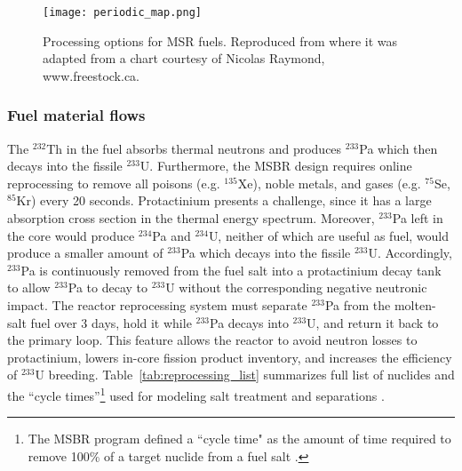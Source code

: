 \begin{figure}[htp!] %
  \texttt{[image: periodic\_map.png]}
  \caption{Processing options for \gls{MSR} fuels. 
          Reproduced from \cite{ahmad_neutronics_2015} where it was adapted 
          from a chart courtesy of Nicolas 
          Raymond, www.freestock.ca.}
  \label{fig:periodic_tab}
\end{figure}

\subsubsection{Fuel material flows}
The $^{232}$Th in the fuel absorbs thermal neutrons and produces $^{233}$Pa 
which then decays into the fissile $^{233}$U. Furthermore, the \gls{MSBR} 
design requires online reprocessing to remove all poisons (e.g. $^{135}$Xe), 
noble metals, and gases (e.g. $^{75}$Se, $^{85}$Kr) every 20 seconds. 
Protactinium presents a challenge, since it has a large absorption cross 
section in the thermal energy spectrum. Moreover, $^{233}$Pa left in the core
 would produce $^{234}$Pa and $^{234}$U, neither of which are useful as fuel, 
 would produce a smaller amount of $^{233}$Pa which decays into the fissile $^{233}$U.
Accordingly, $^{233}$Pa is continuously 
removed from the fuel salt into a protactinium decay tank to allow $^{233}$Pa 
to decay to $^{233}$U without the corresponding negative neutronic impact. The reactor 
reprocessing system must separate $^{233}$Pa from the molten-salt fuel over 3 
days, hold it while $^{233}$Pa decays into $^{233}$U, and return it back to the 
primary loop. This feature allows the reactor to avoid neutron losses to 
protactinium, lowers in-core fission product inventory, and increases the 
efficiency of $^{233}$U breeding. Table~\ref{tab:reprocessing_list} summarizes 
full list of nuclides and the ``cycle times''\footnote{ The \gls{MSBR} program defined a ``cycle time" as the amount of time required to remove 100\% of a target nuclide from a fuel 
salt \cite{robertson_conceptual_1971}.} used for modeling salt treatment and 
separations \cite{robertson_conceptual_1971}. 

